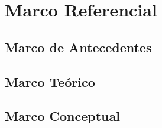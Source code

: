 \chapter{Marco Referencial}
\label{sec:marco}

\section{Marco de Antecedentes}

\section{Marco Te\'orico}

\section{Marco Conceptual}